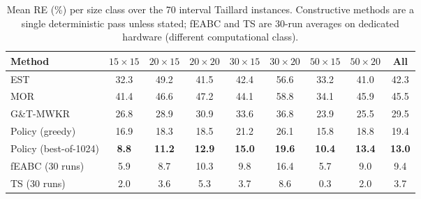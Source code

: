 
\begin{table}[t]
\centering\small
\caption{Mean RE (\%) per size class over the 70 interval
Taillard instances. Constructive methods are a single
deterministic pass unless stated; fEABC and TS are 30-run
averages on dedicated hardware (different computational class).}
\label{tab:seventy}
\begin{tabular}{lcccccccc}
\toprule
Method & $15{\times}15$ & $20{\times}15$ & $20{\times}20$ & $30{\times}15$ & $30{\times}20$ & $50{\times}15$ & $50{\times}20$ & All \\
\midrule
EST & 32.3 & 49.2 & 41.5 & 42.4 & 56.6 & 33.2 & 41.0 & 42.3 \\
MOR & 41.4 & 46.6 & 47.2 & 44.1 & 58.8 & 34.1 & 45.9 & 45.5 \\
G\&T-MWKR & 26.8 & 28.9 & 30.9 & 33.6 & 36.8 & 23.9 & 25.5 & 29.5 \\
Policy (greedy) & 16.9 & 18.3 & 18.5 & 21.2 & 26.1 & 15.8 & 18.8 & 19.4 \\
Policy (best-of-1024) & \textbf{8.8} & \textbf{11.2} & \textbf{12.9} & \textbf{15.0} & \textbf{19.6} & \textbf{10.4} & \textbf{13.4} & \textbf{13.0} \\
\midrule
fEABC (30 runs) & 5.9 & 8.7 & 10.3 & 9.8 & 16.4 & 5.7 & 9.0 & 9.4 \\
TS (30 runs) & 2.0 & 3.6 & 5.3 & 3.7 & 8.6 & 0.3 & 2.0 & 3.7 \\
\bottomrule
\end{tabular}
\end{table}


